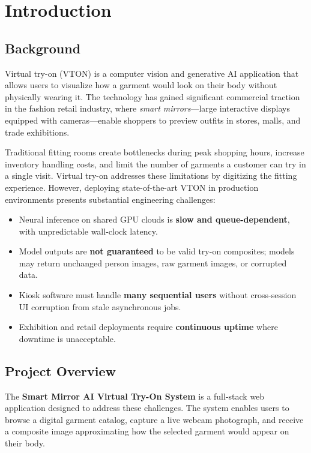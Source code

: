 \chapter{Introduction}
\label{ch:introduction}

\section{Background}
\label{sec:background}

Virtual try-on (VTON) is a computer vision and generative AI application that allows users to visualize how a garment would look on their body without physically wearing it. The technology has gained significant commercial traction in the fashion retail industry, where \textit{smart mirrors}---large interactive displays equipped with cameras---enable shoppers to preview outfits in stores, malls, and trade exhibitions.

Traditional fitting rooms create bottlenecks during peak shopping hours, increase inventory handling costs, and limit the number of garments a customer can try in a single visit. Virtual try-on addresses these limitations by digitizing the fitting experience. However, deploying state-of-the-art VTON in production environments presents substantial engineering challenges:

\begin{itemize}[leftmargin=*]
  \item Neural inference on shared GPU clouds is \textbf{slow and queue-dependent}, with unpredictable wall-clock latency.
  \item Model outputs are \textbf{not guaranteed} to be valid try-on composites; models may return unchanged person images, raw garment images, or corrupted data.
  \item Kiosk software must handle \textbf{many sequential users} without cross-session UI corruption from stale asynchronous jobs.
  \item Exhibition and retail deployments require \textbf{continuous uptime} where downtime is unacceptable.
\end{itemize}

\section{Project Overview}
\label{sec:project-overview}

The \textbf{Smart Mirror AI Virtual Try-On System} is a full-stack web application designed to address these challenges. The system enables users to browse a digital garment catalog, capture a live webcam photograph, and receive a composite image approximating how the selected garment would appear on their body.

